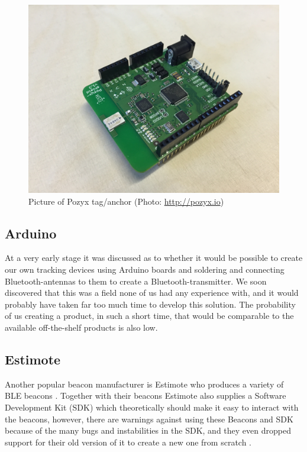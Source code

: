 \documentclass[../Main/thesis.tex]{subfiles}
\begin{document}
\begin{figure}
	\centering
	\includegraphics[width=0.5\linewidth]{../fig/pozyx_tag}
	\caption{Picture of Pozyx tag/anchor (Photo: \url{http://pozyx.io})}
	\label{fig:pozyx_tag}
\end{figure}


\subsection{Arduino}
At a very early stage it was discussed as to whether it would be possible to create our own tracking devices using Arduino boards and soldering and connecting Bluetooth-antennas to them to create a Bluetooth-transmitter.
We soon discovered that this was a field none of us had any experience with, and it would probably have taken far too much time to develop this solution.
The probability of us creating a product, in such a short time, that would be comparable to the available off-the-shelf products is also low.

\subsection{Estimote}
Another popular beacon manufacturer is Estimote who produces a variety of BLE beacons \citep{EstimoteInc.2018}.
Together with their beacons Estimote also supplies a Software Development Kit (SDK) which theoretically should make it easy to interact with the beacons, however, there are warnings against using these Beacons and SDK because of the many bugs and instabilities in the SDK, and they even dropped support for their old version of it to create a new one from scratch \citep{Saetre2017}.


\onlyinsubfile{}
\onlyinsubfile{}
\end{document}

